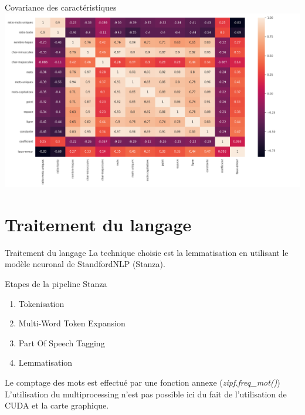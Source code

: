 \documentclass[xelatex,11pt, xcolor=dvipsnames]{beamer}
\begin{document}
\begin{frame}{Covariance des caractéristiques}
	\includegraphics[width=\linewidth]{img/features_corr}
\end{frame}

\section{Traitement du langage}
\begin{frame}{Traitement du langage}
	La technique choisie est la lemmatisation en utilisant le modèle neuronal de StandfordNLP (Stanza).
	\begin{block}{Etapes de la pipeline Stanza}
		\begin{enumerate}
			\item Tokenisation
			\item Multi-Word Token Expansion
			\item Part Of Speech Tagging
			\item Lemmatisation
		\end{enumerate}
	\end{block}
	Le comptage des mots est effectué par une fonction annexe (\emph{zipf.freq\_mot()})
	L'utilisation du multiprocessing n'est pas possible ici du fait de l'utilisation de CUDA et la carte graphique.
	
\end{frame}
\end{document}

